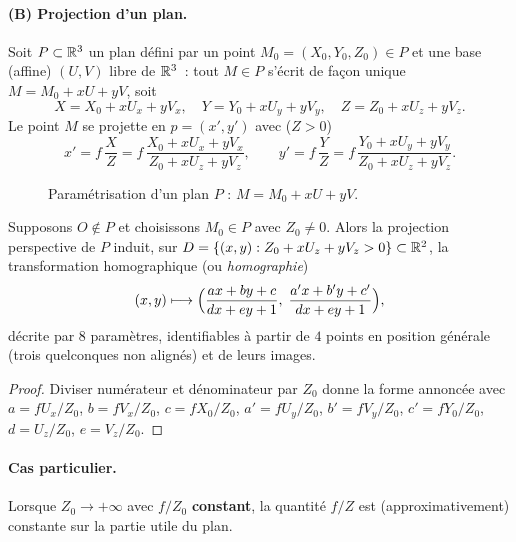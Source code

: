 \paragraph{(B) Projection d'un plan.}
Soit $P\subset\mathbb{R}^3$ un plan défini par un point $M_0=(X_0,Y_0,Z_0)\in P$ et une base (affine) $(U,V)$ libre de $\mathbb{R}^3$~: tout $M\in P$ s'écrit de façon unique $M=M_0+xU+yV$, soit
\[
  X=X_0+xU_x+yV_x,\quad Y=Y_0+xU_y+yV_y,\quad Z=Z_0+xU_z+yV_z .
\]
Le point $M$ se projette en $p=(x',y')$ avec ($Z>0$)
\[
  x'=f\,\frac{X}{Z}=f\,\frac{X_0+xU_x+yV_x}{Z_0+xU_z+yV_z},\qquad
  y'=f\,\frac{Y}{Z}=f\,\frac{Y_0+xU_y+yV_y}{Z_0+xU_z+yV_z}.
\]

\begin{figure}[!htb]\centering
  
  \caption{Paramétrisation d'un plan $P$ : $M=M_0+xU+yV$.}\label{fig:plane-param}
\end{figure}

\begin{proposition}[Homographie]\label{prop:homographie}
  Supposons $O\notin P$ et choisissons $M_0\in P$ avec $Z_0\neq0$.
  Alors la projection perspective de $P$ induit, sur $D=\{(x,y):Z_0+xU_z+yV_z>0\}\subset\mathbb{R}^2$, la transformation homographique (ou \emph{homographie})
  \[
    (x,y)\longmapsto\Bigl(\frac{ax+by+c}{dx+ey+1},\;\frac{a'x+b'y+c'}{dx+ey+1}\Bigr),
  \]
  décrite par $8$ paramètres, identifiables à partir de $4$ points en position générale (trois quelconques non alignés) et de leurs images.


\end{proposition}

\begin{proof}
  Diviser numérateur et dénominateur par $Z_0$ donne la forme annoncée avec $a=fU_x/Z_0$, $b=fV_x/Z_0$, $c=fX_0/Z_0$, $a'=fU_y/Z_0$, $b'=fV_y/Z_0$, $c'=fY_0/Z_0$, $d=U_z/Z_0$, $e=V_z/Z_0$.
\end{proof}


\paragraph{Cas particulier.}
Lorsque $Z_0\to+\infty$ avec $f/Z_0$ \textbf{constant}, la quantité $f/Z$ est (approximativement) constante sur la partie utile du plan.

